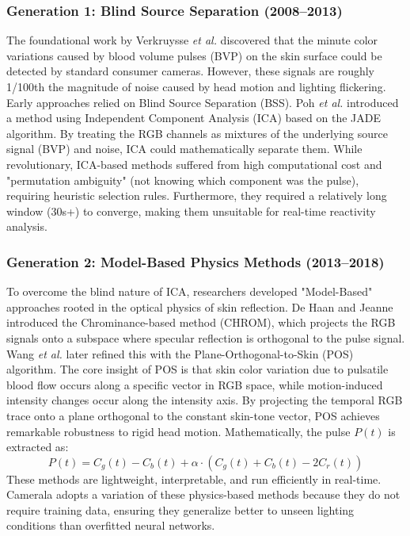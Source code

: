 \documentclass[journal]{IEEEtran}
\newcommand{\etal}{\textit{et al.}}
\begin{document}
\subsubsection{Generation 1: Blind Source Separation (2008--2013)}
The foundational work by Verkruysse \etal \cite{verkruysse2008} discovered that the minute color variations caused by blood volume pulses (BVP) on the skin surface could be detected by standard consumer cameras. However, these signals are roughly 1/100th the magnitude of noise caused by head motion and lighting flickering.
Early approaches relied on Blind Source Separation (BSS). Poh \etal \cite{poh_ica} introduced a method using Independent Component Analysis (ICA) based on the JADE algorithm. By treating the RGB channels as mixtures of the underlying source signal (BVP) and noise, ICA could mathematically separate them. While revolutionary, ICA-based methods suffered from high computational cost and "permutation ambiguity" (not knowing which component was the pulse), requiring heuristic selection rules. Furthermore, they required a relatively long window (30s+) to converge, making them unsuitable for real-time reactivity analysis.

\subsubsection{Generation 2: Model-Based Physics Methods (2013--2018)}
To overcome the blind nature of ICA, researchers developed "Model-Based" approaches rooted in the optical physics of skin reflection. De Haan and Jeanne \cite{dehaan_chrom} introduced the Chrominance-based method (CHROM), which projects the RGB signals onto a subspace where specular reflection is orthogonal to the pulse signal. Wang \etal \cite{wang_pos} later refined this with the Plane-Orthogonal-to-Skin (POS) algorithm.
The core insight of POS is that skin color variation due to pulsatile blood flow occurs along a specific vector in RGB space, while motion-induced intensity changes occur along the intensity axis. By projecting the temporal RGB trace onto a plane orthogonal to the constant skin-tone vector, POS achieves remarkable robustness to rigid head motion. Mathematically, the pulse $P(t)$ is extracted as:
\begin{equation}
    P(t) = C_g(t) - C_b(t) + \alpha \cdot (C_g(t) + C_b(t) - 2C_r(t))
\end{equation}
These methods are lightweight, interpretable, and run efficiently in real-time. Camerala adopts a variation of these physics-based methods because they do not require training data, ensuring they generalize better to unseen lighting conditions than overfitted neural networks.
\end{document}
